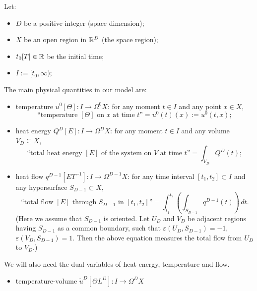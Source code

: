 \begin{discussion}
  \label{idec/heat_transport/continuous/model_with_differential_forms-discussion}
  Let:
  \begin{itemize}
    \item
      $D$ be a positive integer (space dimension);
    \item
      $X$ be an open region in $\mathbb{R}^D$ (the space region);
    \item
      $t_0 [T] \in \mathbb{R}$ be the initial time;
    \item
      $I := [t_0, \infty)$;
  \end{itemize}
  The main physical quantities in our model are:
  \begin{itemize}
    \item
      temperature $u^0 [\Theta] \colon I \to \Omega^0 X$:
      for any moment $t \in I$ and any point $x \in X$,
      \begin{equation}
        \text{``temperature $[\Theta]$ on $x$ at time $t$''}
        = u^0(t)(x) := u^0(t, x);
      \end{equation}
    \item
      heat energy $Q^D [E] \colon I \to \Omega^D X$:
      for any moment $t \in I$ and any volume $V_D \subseteq X$,
      \begin{equation}
        \text{``total heat energy $[E]$ of the system on $V$ at time $t$''}
        = \int_{V_D} Q^D(t);
      \end{equation}
    \item
      heat flow $q^{D - 1} [E T^{-1}] \colon I \to \Omega^{D - 1} X$:
      for any time interval $[t_1, t_2] \subset I$
      and any hypersurface $S_{D - 1} \subset X$,
      \begin{equation}
        \text{``total flow $[E]$ through $S_{D - 1}$ in $[t_1, t_2]$''}
        = \int_{t_1}^{t_2}\left(\int_{S_{D - 1}} q^{D - 1}(t)\right)\, d t.
      \end{equation}
      (Here we assume that $S_{D - 1}$ is oriented.
       Let $U_D$ and $V_D$ be adjacent regions having $S_{D - 1}$ as a common
       boundary, such that $\varepsilon(U_D, S_{D - 1}) = -1$,
       $\varepsilon(V_D, S_{D - 1}) = 1$.
       Then the above equation measures the total flow from $U_D$ to $V_D$.)
  \end{itemize}
  We will also need the dual variables of heat energy, temperature and flow.
  \begin{itemize}
    \item
      temperature-volume $\tilde{u}^D [\Theta L^D] \colon I \to \Omega^D X$

\end{itemize}
\end{discussion}

